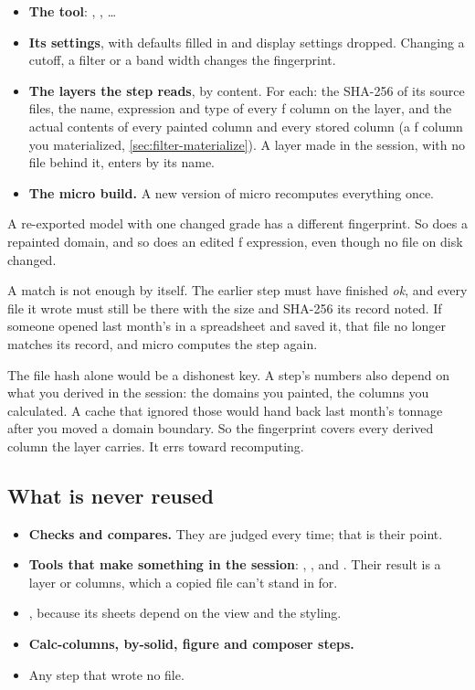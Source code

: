 \begin{itemize}
\item \textbf{The tool}: , , …
\item \textbf{Its settings}, with defaults filled in and display settings dropped. Changing a cutoff, a filter or a band width changes the fingerprint.
\item \textbf{The layers the step reads}, by content. For each: the SHA-256 of its source files, the name, expression and type of every ƒ column on the layer, and the actual contents of every painted column and every stored column (a ƒ column you materialized, \cref{sec:filter-materialize}). A layer made in the session, with no file behind it, enters by its name.
\item \textbf{The micro build.} A new version of micro recomputes everything once.
\end{itemize}

A re-exported model with one changed grade has a different fingerprint. So does a repainted domain, and so does an edited ƒ expression, even though no file on disk changed.

A match is not enough by itself. The earlier step must have finished \emph{ok}, and every file it wrote must still be there with the size and SHA-256 its record noted. If someone opened last month's  in a spreadsheet and saved it, that file no longer matches its record, and micro computes the step again.

\begin{why}
The file hash alone would be a dishonest key. A step's numbers also depend on what you derived in the session: the domains you painted, the columns you calculated. A cache that ignored those would hand back last month's tonnage after you moved a domain boundary. So the fingerprint covers every derived column the layer carries. It errs toward recomputing.
\end{why}

\subsection{What is never reused}
\begin{itemize}
\item \textbf{Checks and compares.} They are judged every time; that is their point.
\item \textbf{Tools that make something in the session}: , ,  and . Their result is a layer or columns, which a copied file can't stand in for.
\item \textbf{}, because its sheets depend on the view and the styling.
\item \textbf{Calc-columns, by-solid, figure and composer steps.}
\item Any step that wrote no file.
\end{itemize}

